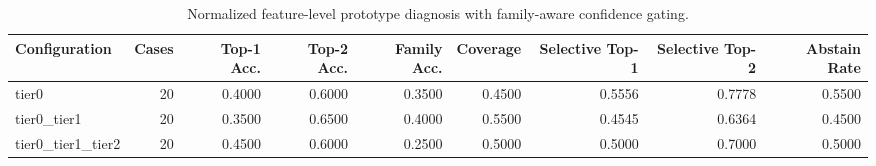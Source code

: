 \begin{table}[t]
\centering
\caption{Normalized feature-level prototype diagnosis with family-aware confidence gating.}
\label{tab:dice_stressor_hierarchical_diagnosis}
\footnotesize
\begin{tabular}{lrrrrrrrr}
\toprule
Configuration & Cases & Top-1 Acc. & Top-2 Acc. & Family Acc. & Coverage & Selective Top-1 & Selective Top-2 & Abstain Rate \\
\midrule
tier0 & 20 & 0.4000 & 0.6000 & 0.3500 & 0.4500 & 0.5556 & 0.7778 & 0.5500 \\
tier0_tier1 & 20 & 0.3500 & 0.6500 & 0.4000 & 0.5500 & 0.4545 & 0.6364 & 0.4500 \\
tier0_tier1_tier2 & 20 & 0.4500 & 0.6000 & 0.2500 & 0.5000 & 0.5000 & 0.7000 & 0.5000 \\
\bottomrule
\end{tabular}

\end{table}

